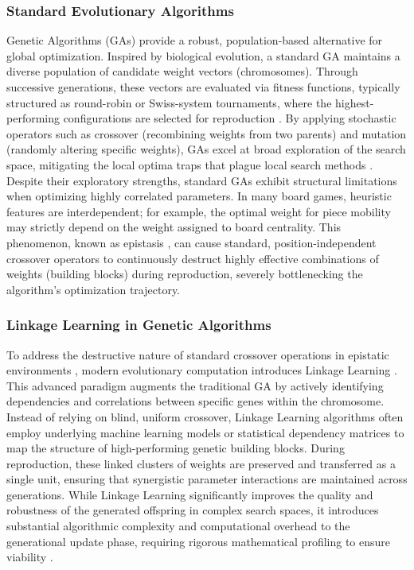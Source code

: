 \subsubsection{Standard Evolutionary Algorithms}

Genetic Algorithms (GAs) \cite{goldberg1989genetic} provide a robust, population-based alternative for global optimization. Inspired by biological evolution, a standard GA maintains a diverse population of candidate weight vectors (chromosomes). Through successive generations, these vectors are evaluated via fitness functions, typically structured as round-robin or Swiss-system tournaments, where the highest-performing configurations are selected for reproduction \cite{shukla2015comparative}. By applying stochastic operators such as crossover (recombining weights from two parents) and mutation (randomly altering specific weights), GAs excel at broad exploration of the search space, mitigating the local optima traps that plague local search methods \cite{Katoch2021}. Despite their exploratory strengths, standard GAs exhibit structural limitations when optimizing highly correlated parameters. In many board games, heuristic features are interdependent; for example, the optimal weight for piece mobility may strictly depend on the weight assigned to board centrality. This phenomenon, known as epistasis \cite{goldberg1989genetic}, can cause standard, position-independent crossover operators to continuously destruct highly effective combinations of weights (building blocks) during reproduction, severely bottlenecking the algorithm's optimization trajectory.

\subsubsection{Linkage Learning in Genetic Algorithms}

To address the destructive nature of standard crossover operations in epistatic environments \cite{goldberg1989genetic}, modern evolutionary computation introduces Linkage Learning \cite{newman2006use}. This advanced paradigm augments the traditional GA by actively identifying dependencies and correlations between specific genes within the chromosome. Instead of relying on blind, uniform crossover, Linkage Learning algorithms often employ underlying machine learning models or statistical dependency matrices \cite{pelikan1999boa} to map the structure of high-performing genetic building blocks. During reproduction, these linked clusters of weights are preserved and transferred as a single unit, ensuring that synergistic parameter interactions are maintained across generations. While Linkage Learning significantly improves the quality and robustness of the generated offspring in complex search spaces, it introduces substantial algorithmic complexity and computational overhead to the generational update phase, requiring rigorous mathematical profiling to ensure viability \cite{10.1145/3583131.3590349}.

